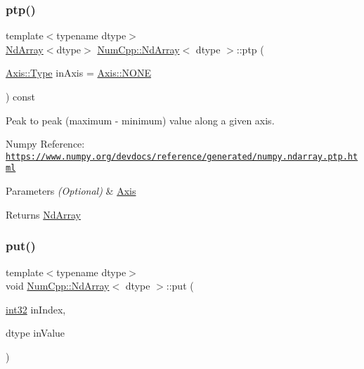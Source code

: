 \subsubsection{\texorpdfstring{ptp()}{ptp()}}
{\footnotesize\ttfamily template$<$typename dtype$>$ \\
\mbox{\hyperlink{class_num_cpp_1_1_nd_array}{Nd\+Array}}$<$dtype$>$ \mbox{\hyperlink{class_num_cpp_1_1_nd_array}{Num\+Cpp\+::\+Nd\+Array}}$<$ dtype $>$\+::ptp (\begin{DoxyParamCaption}\item[{\mbox{\hyperlink{struct_num_cpp_1_1_axis_ac10eb76f8631762d9ed70c40c42ca6cb}{Axis\+::\+Type}}}]{in\+Axis = {\ttfamily \mbox{\hyperlink{struct_num_cpp_1_1_axis_ac10eb76f8631762d9ed70c40c42ca6cba747ae657022cca1d87702b56d0c038e9}{Axis\+::\+N\+O\+NE}}} }\end{DoxyParamCaption}) const\hspace{0.3cm}{\ttfamily [inline]}}

Peak to peak (maximum -\/ minimum) value along a given axis.

Numpy Reference\+: \href{https://www.numpy.org/devdocs/reference/generated/numpy.ndarray.ptp.html}{\tt https\+://www.\+numpy.\+org/devdocs/reference/generated/numpy.\+ndarray.\+ptp.\+html}


\begin{DoxyParams}{Parameters}
{\em (\+Optional)} & \mbox{\hyperlink{struct_num_cpp_1_1_axis}{Axis}} \\
\hline
\end{DoxyParams}
\begin{DoxyReturn}{Returns}
\mbox{\hyperlink{class_num_cpp_1_1_nd_array}{Nd\+Array}} 
\end{DoxyReturn}
\mbox{\label{class_num_cpp_1_1_nd_array_a49b276a6a6750339e81e3d7e46579d4e}} 
\subsubsection{\texorpdfstring{put()}{put()}\hspace{0.1cm}{\footnotesize\ttfamily [1/12]}}
{\footnotesize\ttfamily template$<$typename dtype$>$ \\
void \mbox{\hyperlink{class_num_cpp_1_1_nd_array}{Num\+Cpp\+::\+Nd\+Array}}$<$ dtype $>$\+::put (\begin{DoxyParamCaption}\item[{\mbox{\hyperlink{namespace_num_cpp_acf3eb1592f8b248ff0a236634864633c}{int32}}}]{in\+Index,  }\item[{dtype}]{in\+Value }\end{DoxyParamCaption})\hspace{0.3cm}{\ttfamily [inline]}}


